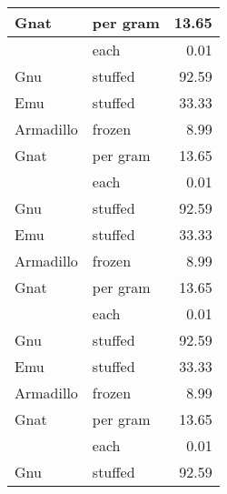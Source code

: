 {
\setlength{\extrarowheight}{1pt}
\large
{}

\tablelasttail{}
\begin{center}
\begin{xtabular}{|l||l|r|}
Gnat      & per gram & 13.65 \\
\hline
          & each     & 0.01  \\
\hline
Gnu       & stuffed  & 92.59 \\
\hline
Emu       & stuffed  & 33.33 \\
\hline
Armadillo & frozen   & 8.99  \\
\hline
Gnat      & per gram & 13.65 \\
\hline
          & each     & 0.01  \\
\hline
Gnu       & stuffed  & 92.59 \\
\hline
Emu       & stuffed  & 33.33 \\
\hline
Armadillo & frozen   & 8.99  \\
\hline
Gnat      & per gram & 13.65 \\
\hline
          & each     & 0.01  \\
\hline
Gnu       & stuffed  & 92.59 \\
\hline
Emu       & stuffed  & 33.33 \\
\hline
Armadillo & frozen   & 8.99  \\
\hline
Gnat      & per gram & 13.65 \\
\hline
          & each     & 0.01  \\
\hline
Gnu       & stuffed  & 92.59 \\

\end{xtabular}
\end{center}}

